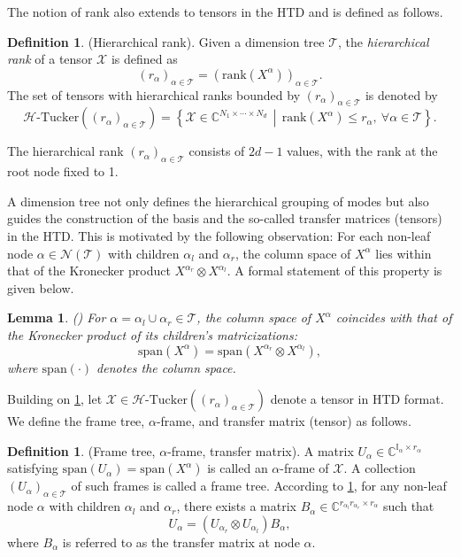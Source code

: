 \documentclass{article}
\theoremstyle{plain}
\newtheorem{lemma}[theorem]{Lemma}
\theoremstyle{definition}
\newtheorem{definition}[theorem]{Definition}
\theoremstyle{remark}
\begin{document}
The notion of rank also extends to tensors in the HTD and is defined as follows.
\begin{definition}
(Hierarchical rank). Given a dimension tree \(\mathcal{T}\), the \textit{hierarchical rank} of a tensor \(\mathcal{X}\) is defined as
\[
(r_{\alpha})_{\alpha\in\mathcal{T}} = (\mathrm{rank}(X^{\alpha}))_{\alpha\in\mathcal{T}}.
\]
The set of tensors with hierarchical ranks bounded by \((r_\alpha)_{\alpha\in\mathcal{T}}\) is denoted by
\[
\mathcal{H}\text{-Tucker}((r_\alpha)_{\alpha\in\mathcal{T}}) = \left\{ \mathcal{X} \in \mathbb{C}^{N_1\times \cdots \times N_d} \,\middle|\, \mathrm{rank}(X^{\alpha}) \leq r_\alpha,\ \forall \alpha \in \mathcal{T} \right\}.
\]
\end{definition}
\noindent The hierarchical rank \((r_\alpha)_{\alpha\in\mathcal{T}}\) consists of \(2d-1\) values, with the rank at the root node fixed to 1. 

A dimension tree not only defines the hierarchical grouping of modes but also guides the construction of the basis and the so-called transfer matrices (tensors) in the HTD. This is motivated by the following observation: For each non-leaf node \(\alpha \in \mathcal{N}(\mathcal{T})\) with children \(\alpha_l\) and \(\alpha_r\), the column space of \(X^{\alpha}\) lies within that of the Kronecker product \(X^{\alpha_r} \otimes X^{\alpha_l}\). A formal statement of this property is given below.

\begin{lemma}\label{lem:HTD_foundation}
(\cite{grasedyck2010hierarchical,kressner2012htucker})  
For $\alpha = \alpha_l \cup \alpha_r \in \mathcal{T}$, the column space of $X^{\alpha}$ coincides with that of the Kronecker product of its children's matricizations:
\[
\mathrm{span}(X^{\alpha}) = \mathrm{span}(X^{\alpha_r} \otimes X^{\alpha_l}),
\]
where $\mathrm{span}(\cdot)$ denotes the column space.
\end{lemma}


Building on \cref{lem:HTD_foundation}, let \(\mathcal{X} \in \mathcal{H}\text{-Tucker}((r_\alpha)_{\alpha\in\mathcal{T}})\) denote a tensor in HTD format. We define the frame tree, \(\alpha\)-frame, and transfer matrix (tensor) as follows.
\begin{definition}
(Frame tree, \(\alpha\)-frame, transfer matrix).    
A matrix \(U_\alpha \in \mathbb{C}^{\mathbb{I}_\alpha \times r_\alpha}\) satisfying \(\mathrm{span}(U_\alpha) = \mathrm{span}(X^{\alpha})\) is called an \(\alpha\)-frame of \(\mathcal{X}\).  
A collection \((U_\alpha)_{\alpha \in \mathcal{T}}\) of such frames is called a frame tree.  
According to \cref{lem:HTD_foundation}, for any non-leaf node \(\alpha\) with children \(\alpha_l\) and \(\alpha_r\), there exists a matrix \(B_\alpha \in \mathbb{C}^{r_{\alpha_l}r_{\alpha_r} \times r_\alpha}\) such that
\begin{equation}\label{eq:HTD_foundation}
    U_\alpha = (U_{\alpha_r} \otimes U_{\alpha_l}) B_\alpha,
\end{equation}
where $B_\alpha$ is referred to as the transfer matrix at node \(\alpha\).
\end{definition}
\end{document}
